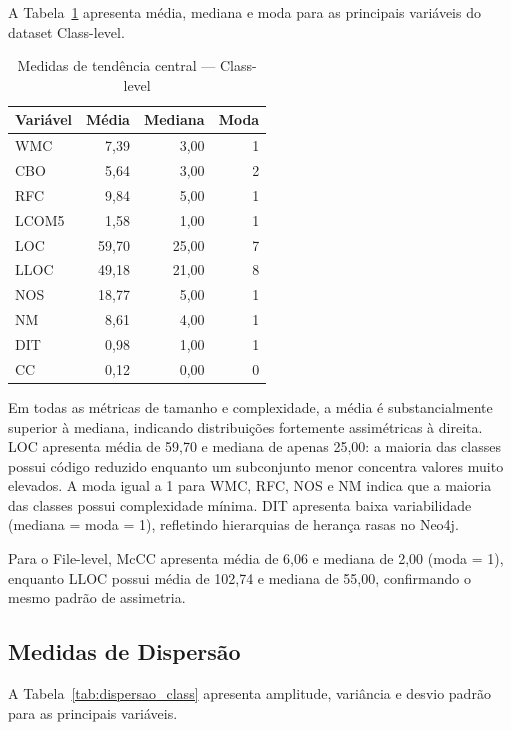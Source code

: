 \documentclass[12pt]{article}
\begin{document}
A Tabela~\ref{tab:tendencia_class} apresenta média, mediana e moda para as principais variáveis do dataset Class-level.

\begin{table}[H]
\centering
\caption{Medidas de tendência central --- Class-level}
\label{tab:tendencia_class}
\footnotesize
\begin{tabular}{lrrr}
\toprule
\textbf{Variável} & \textbf{Média} & \textbf{Mediana} & \textbf{Moda} \\
\midrule
WMC   &  7,39  &  3,00  &  1 \\
CBO   &  5,64  &  3,00  &  2 \\
RFC   &  9,84  &  5,00  &  1 \\
LCOM5 &  1,58  &  1,00  &  1 \\
LOC   & 59,70  & 25,00  &  7 \\
LLOC  & 49,18  & 21,00  &  8 \\
NOS   & 18,77  &  5,00  &  1 \\
NM    &  8,61  &  4,00  &  1 \\
DIT   &  0,98  &  1,00  &  1 \\
CC    &  0,12  &  0,00  &  0 \\
\bottomrule
\end{tabular}
\end{table}

Em todas as métricas de tamanho e complexidade, a média é substancialmente superior à mediana, indicando distribuições fortemente assimétricas à direita. LOC apresenta média de 59,70 e mediana de apenas 25,00: a maioria das classes possui código reduzido enquanto um subconjunto menor concentra valores muito elevados. A moda igual a 1 para WMC, RFC, NOS e NM indica que a maioria das classes possui complexidade mínima. DIT apresenta baixa variabilidade (mediana = moda = 1), refletindo hierarquias de herança rasas no Neo4j.

Para o File-level, McCC apresenta média de 6,06 e mediana de 2,00 (moda = 1), enquanto LLOC possui média de 102,74 e mediana de 55,00, confirmando o mesmo padrão de assimetria.

\subsection{Medidas de Dispersão}

A Tabela~\ref{tab:dispersao_class} apresenta amplitude, variância e desvio padrão para as principais variáveis.
\end{document}
